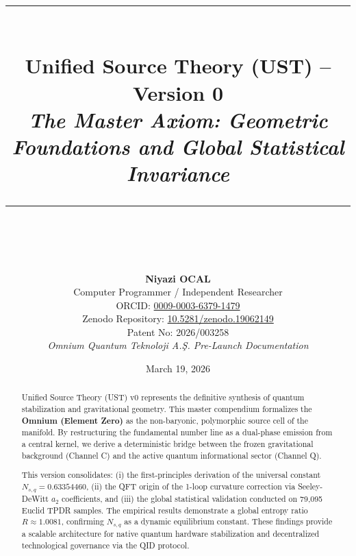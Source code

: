 \documentclass[12pt,a4paper]{article}
\title{
    \vspace{-2cm}
    \rule{\linewidth}{0.5mm} \\ [0.4cm]
    \textbf{\Large Unified Source Theory (UST) -- Version 0} \\
    \large \textit{The Master Axiom: Geometric Foundations and Global Statistical Invariance} \\
    \rule{\linewidth}{0.5mm} \\ [0.8cm]
}
\author{
    \textbf{Niyazi OCAL} \\
    \small Computer Programmer / Independent Researcher \\
    \small ORCID: \href{https://orcid.org/0009-0003-6379-1479}{0009-0003-6379-1479} \\
    \small Zenodo Repository: \href{https://doi.org/10.5281/zenodo.19062149}{10.5281/zenodo.19062149} \\
    \small Patent No: 2026/003258 \\ [0.5cm]
    \small \textit{Omnium Quantum Teknoloji A.Ş. Pre-Launch Documentation}
}
\date{March 19, 2026}
\begin{document}
\maketitle

\begin{abstract}
Unified Source Theory (UST) v0 represents the definitive synthesis of quantum stabilization and gravitational geometry. This master compendium formalizes the \textbf{Omnium (Element Zero)} as the non-baryonic, polymorphic source cell of the manifold. By restructuring the fundamental number line as a dual-phase emission from a central kernel, we derive a deterministic bridge between the frozen gravitational background (Channel C) and the active quantum informational sector (Channel Q). 

This version consolidates: (i) the first-principles derivation of the universal constant $N_{s,q} = 0.63354460$, (ii) the QFT origin of the 1-loop curvature correction via Seeley-DeWitt $a_2$ coefficients, and (iii) the global statistical validation conducted on 79,095 Euclid TPDR samples. The empirical results demonstrate a global entropy ratio $R \approx 1.0081$, confirming $N_{s,q}$ as a dynamic equilibrium constant. These findings provide a scalable architecture for native quantum hardware stabilization and decentralized technological governance via the QID protocol.
\end{abstract}

\vspace{1cm}
\tableofcontents
\newpage
\end{document}
